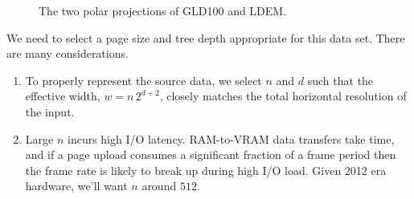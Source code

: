 \documentclass[oneside,10pt]{memoir}
\begin{document}
\begin{Spacing}{1.1}
\begin{figure}
  \centering
  \caption{The two polar projections of GLD100 and LDEM.}
  \label{fig:gldp}
\end{figure}

We need to select a page size and tree depth appropriate for this data set. There are many considerations.

\begin{enumerate}
\item To properly represent the source data, we select $n$ and $d$ such that the effective width, $w=n\,2^{d+2}$, closely matches the total horizontal resolution of the input.

\item Large $n$ incurs high I/O latency. RAM-to-VRAM data transfers take time, and if a page upload consumes a significant fraction of a frame period then the frame rate is likely to break up during high I/O load. Given 2012 era hardware, we'll want $n$ around $512$.


\end{enumerate}
\end{Spacing}
\end{document}
